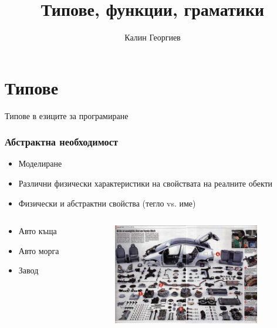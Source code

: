\documentclass{beamer}
\begin{document}
\title[Увод в програмирането]{Типове, функции, граматики} 
\author{Калин Георгиев} 
\frame{\titlepage} 


\section{Типове} 


\begin{frame}
\centerline{Типове в езиците за програмиране}
\end{frame}



\begin{frame}[fragile]
\frametitle{Абстрактна необходимост}



\begin{itemize}
\item Моделиране
\pause
\item Различни физически характеристики на свойствата на реалните обекти
\pause
\item Физически и абстрактни свойства (тегло vs. име)

\end{itemize}

\pause


\begin{columns}[t]
  \begin{column}{0.4\textwidth}
\begin{itemize}
  \item Авто къща
  \item Авто морга
  \item Завод 
\end{itemize}

  \end{column}
  \begin{column}{0.6\textwidth}

\includegraphics[width=6.4cm]{images/parts} 

  \end{column}
\end{columns}



\end{frame}
\end{document}
